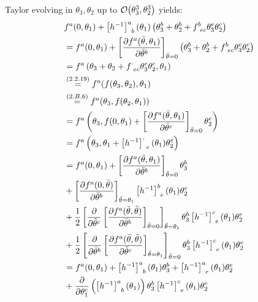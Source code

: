 \subsubsection{ }
Taylor evolving  in $\theta_3, \theta_2$ up to $\order{\theta_3^3, \theta_2^3}$ yields:
\begin{align*} 
	&f^a(0,\theta_1)+\left[h^{-1}\right]^a_{\hphantom{a}b}(\theta_1)\left(\theta_3^b+\theta_2^b+f^b_{\hphantom{b}ec} \theta_3^e\theta_2^c\right)\\
	&=f^a(0,\theta_1)+\left[\partialderivative{f^a(\bar{\theta},\theta_1)}{\bar{\theta}^b}\right]_{\bar{\theta}=0}\left(\theta_3^b+\theta_2^b+f^b_{\hphantom{b}ec} \theta_3^e\theta_2^c\right)\\
	&=f^a\left(\theta_3+\theta_2+f^\cdot_{\hphantom{b}ec} \theta_3^e\theta_2^c,\theta_1\right)\\
	&\overset{\eqc{2.2.19}}{=}f^a(f(\theta_3,\theta_2),\theta_1)\\
	&\overset{\eqc{2.B.6}}{=}f^a(\theta_3,f(\theta_2,\theta_1))\\
	&=f^a\left(\theta_3, f(0,\theta_1)+\left[\partialderivative{f^a(\bar{\theta},\theta_1)}{\bar{\theta}^e}\right]_{\bar{\theta}=0}\theta_2^e\right)\\
	&=f^a\left(\theta_3, \theta_1+\left[h^{-1}\right]^\cdot_{\hphantom{a}e}(\theta_1)\theta_2^e\right)\\
	&=f^a(0,\theta_1)+\left[\partialderivative{f^a(\bar{\theta},\theta_1)}{\bar{\theta}^b}\right]_{\bar{\theta}=0}\theta_3^b\\
	&+\left[\partialderivative{f^a(0,\bar{\theta})}{\bar{\theta}^b}\right]_{\bar{\theta}=\theta_1}\left[h^{-1}\right]^b_{\hphantom{b}e}(\theta_1)\theta_2^e\\
	&+\dfrac{1}{2}\left[\partialderivative{}{\tilde{\theta}^c}\left[\partialderivative{f^a(\bar{\theta},\tilde{\theta})}{\bar{\theta}^b}\right]_{\bar{\theta}=0}\right]_{\tilde{\theta}=\theta_1}
	\theta_3^b	\left[h^{-1}\right]^c_{\hphantom{c}e}(\theta_1)\theta_2^e\\
	&+\dfrac{1}{2}\left[\partialderivative{}{\bar{\theta}^b}\left[\partialderivative{f^a(\bar{\theta},\tilde{\theta})}{\tilde{\theta}^c}\right]_{\tilde{\theta}=\theta_1}\right]_{\bar{\theta}=0}
	\theta_3^b	\left[h^{-1}\right]^c_{\hphantom{c}e}(\theta_1)\theta_2^e\\
	&=f^a(0,\theta_1)+\left[h^{-1}\right]^a_{\hphantom{a}b}(\theta_1)\theta_3^b+\left[h^{-1}\right]^a_{\hphantom{a}e}(\theta_1)\theta_2^e\\
	&+ \partialderivative{}{\theta_1^c}\left(\left[h^{-1}\right]^a_{\hphantom{a}b}(\theta_1)\right)\theta_3^b	\left[h^{-1}\right]^c_{\hphantom{c}e}(\theta_1)\theta_2^e\\
\end{align*}

